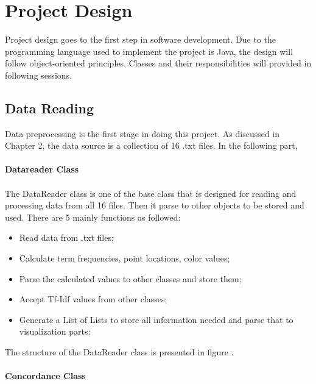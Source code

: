 \clearpage
\section{Project Design}
Project design goes to the first step in software development. Due to the programming language used to implement the project is Java, the design will follow object-oriented principles. Classes and their responsibilities will provided in following sessions.

\subsection{Data Reading}
Data preprocessing is the first stage in doing this project. As discussed in Chapter 2, the data source is a collection of 16 .txt files. In the following part, 

\paragraph{Datareader Class}

\paragraph[]{}The DataReader class is one of the base class that is designed for reading and processing data from all 16 files. Then it parse to other objects to be stored and used. There are 5 mainly functions as followed:

\begin{itemize}
	\item \textbf{}Read data from .txt files;
	\item \textbf{}Calculate term frequencies, point locations, color values; 
	\item \textbf{}Parse the calculated values to other classes and store them;
	\item \textbf{}Accept Tf-Idf values from other classes;
	\item \textbf{}Generate a List of Lists to store all information needed and parse that to visualization parts;
\end{itemize} 

The structure of the DataReader class is presented in figure \label{dataReader}.

\paragraph{Concordance Class}

